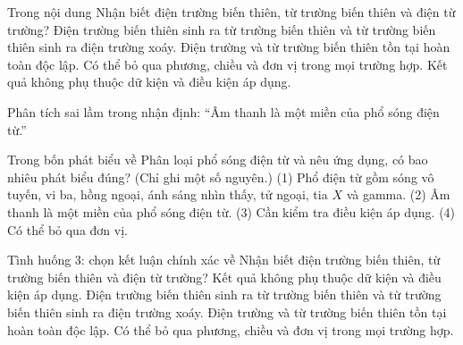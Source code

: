 \begin{ex}
Trong nội dung Nhận biết điện trường biến thiên, từ trường biến thiên và điện từ trường?
\choice
{\True Điện trường biến thiên sinh ra từ trường biến thiên và từ trường biến thiên sinh ra điện trường xoáy.}
{Điện trường và từ trường biến thiên tồn tại hoàn toàn độc lập.}
{Có thể bỏ qua phương, chiều và đơn vị trong mọi trường hợp.}
{Kết quả không phụ thuộc dữ kiện và điều kiện áp dụng.}
\end{ex}

\begin{bt}
Phân tích sai lầm trong nhận định: “Âm thanh là một miền của phổ sóng điện từ.”
\end{bt}

\begin{ex}
Trong bốn phát biểu về Phân loại phổ sóng điện từ và nêu ứng dụng, có bao nhiêu phát biểu đúng? (Chỉ ghi một số nguyên.) (1) Phổ điện từ gồm sóng vô tuyến, vi ba, hồng ngoại, ánh sáng nhìn thấy, tử ngoại, tia $X$ và gamma. (2) Âm thanh là một miền của phổ sóng điện từ. (3) Cần kiểm tra điều kiện áp dụng. (4) Có thể bỏ qua đơn vị.
\end{ex}

\begin{ex}
Tình huống 3: chọn kết luận chính xác về Nhận biết điện trường biến thiên, từ trường biến thiên và điện từ trường?
\choice
{Kết quả không phụ thuộc dữ kiện và điều kiện áp dụng.}
{\True Điện trường biến thiên sinh ra từ trường biến thiên và từ trường biến thiên sinh ra điện trường xoáy.}
{Điện trường và từ trường biến thiên tồn tại hoàn toàn độc lập.}
{Có thể bỏ qua phương, chiều và đơn vị trong mọi trường hợp.}
\end{ex}


